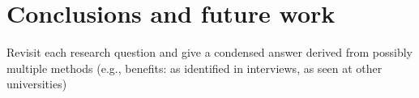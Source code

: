 \section{Conclusions and future work}
Revisit each research question and give a condensed answer derived from possibly multiple methods (e.g., benefits: as identified in interviews, as seen at other universities)